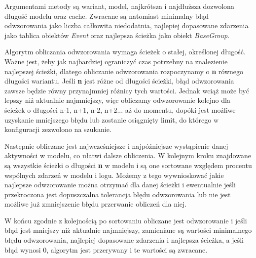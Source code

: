 Argumentami metody są wariant, model, najkrótsza i najdłuższa dozwolona długość modelu oraz cache. Zwracane są natomiast minimalny błąd odwzorowania jako liczba całkowita niedodatnia, najlepiej dopasowane zdarzenia jako tablica obiektów \textit{Event} oraz najlepsza ścieżka jako obiekt \textit{BaseGroup}.

Algorytm obliczania odwzorowania wymaga ścieżek o stałej, określonej długość. Ważne jest, żeby jak najbardziej ograniczyć czas potrzebny na znalezienie najlepszej ścieżki, dlatego obliczanie odwzorowania rozpoczynamy o \textbf{n} równego długości wariantu. Jeśli \textbf{n} jest różne od długości ścieżki, błąd odwzorowania zawsze będzie równy przynajmniej różnicy tych wartości. Jednak wciąż może być lepszy niż aktualnie najmniejszy, więc obliczamy odwzorowanie kolejno dla ścieżek o długości n-1, n+1, n-2, n+2... aż do momentu, dopóki jest możliwe uzyskanie mniejszego błędu lub zostanie osiągnięty limit, do którego w konfiguracji zezwolono na szukanie. 

Następnie obliczane jest najwcześniejsze i najpóźniejsze wystąpienie danej aktywności w modelu, co ułatwi dalsze obliczenia. W kolejnym kroku znajdowane są wszystkie ścieżki o długości \textbf{n} w modelu i są one sortowane względem procentu wspólnych zdarzeń w modelu i logu. Możemy z tego wywnioskować jakie najlepsze odwzorowanie można otrzymać dla danej ścieżki i ewentualnie jeśli przekroczona jest dopuszczalna tolerancja błędu odwzorowania lub nie jest możliwe już zmniejszenie błędu przerwanie obliczeń dla niej.    

W końcu zgodnie z kolejnością po sortowaniu obliczane jest odwzorowanie i jeśli błąd jest mniejszy niż aktualnie najmniejszy, zamieniane są wartości minimalnego błędu odwzorowania, najlepiej dopasowane zdarzenia i najlepsza ścieżka, a jeśli błąd wynosi 0, algorytm jest przerywany i te wartości są zwracane.

